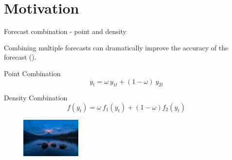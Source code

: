 \section{Motivation}

\logo{}

\begin{frame}{Forecast combination - point and density}

    Combining multiple forecasts can dramatically improve the accuracy of the forecast (\cite{BG69}).
    
    \vspace{5mm}

    
    Point Combination 
    \[y_t = \omega \ y_{1t} + (1-\omega) \ y_{2t}\]

    Density Combination
    \[f(y_t) = \omega \ f_1(y_t) + (1-\omega) f_2(y_t)\]


\begin{figure}[b]
\centering
\includegraphics[width=3cm]{Graph/Weather.jpg}
\end{figure}

\end{frame}


